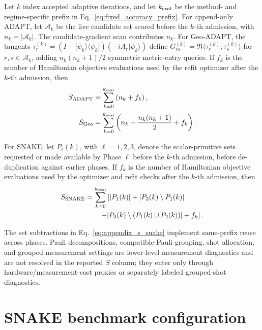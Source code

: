 \documentclass[
  reprint,
  amsmath,
  amssymb,
  aps,
  pra,
  nofootinbib,
  superscriptaddress,
  floatfix
]{revtex4-2}
\begin{document}
Let \(k\) index accepted adaptive iterations, and let \(k_{\rm eval}\) be
the method- and regime-specific prefix in Eq.~\eqref{eq:fixed_accuracy_prefix}.
For append-only ADAPT, let \(\mathcal A_k\) be the live candidate set scored
before the \(k\)-th admission, with \(n_k=|\mathcal A_k|\). The
candidate-gradient scan contributes \(n_k\). For Geo-ADAPT, the tangents
\(\tau_r^{(k)}=(I-|\psi_k\rangle\langle\psi_k|)(-iA_r|\psi_k\rangle)\)
define \(G_{rs}^{(k)}=\Re\langle\tau_r^{(k)},\tau_s^{(k)}\rangle\) for
\(r,s\in\mathcal A_k\), adding \(n_k(n_k+1)/2\) symmetric metric-entry
queries. If \(f_k\) is the number of Hamiltonian objective evaluations used
by the refit optimizer after the \(k\)-th admission, then
\begin{equation*}
\begin{aligned}
S_{\rm ADAPT}
&=
\sum_{k=0}^{k_{\rm eval}}
\left(n_k+f_k\right),
\\
S_{\rm Geo}
&=
\sum_{k=0}^{k_{\rm eval}}
\left(n_k+\frac{n_k(n_k+1)}{2}+f_k\right).
\end{aligned}
\end{equation*}

For SNAKE, let \(P_\ell(k)\), with \(\ell=1,2,3\), denote the scalar-primitive sets requested or made available by Phase \(\ell\) before the \(k\)-th admission, before de-duplication against earlier phases. If \(f_k\) is the number of Hamiltonian objective evaluations used by the optimizer and refit checks after the \(k\)-th admission, then
\begin{align}
S_{\rm SNAKE}
&=
\sum_{k=0}^{k_{\rm eval}}
\left[
|P_1(k)|+|P_2(k)\setminus P_1(k)|
\right.
\nonumber\\
&\qquad\left.
 +|P_3(k)\setminus(P_1(k)\cup P_2(k))|
+f_k
\right].
\label{eq:appendix_s_snake}
\end{align}

The set subtractions in Eq.~\eqref{eq:appendix_s_snake} implement same-prefix reuse across phases. Pauli decompositions, compatible-Pauli grouping, shot allocation, and grouped measurement settings are lower-level measurement diagnostics and are not resolved in the reported \(S\) column; they enter only through hardware/measurement-cost proxies or separately labeled grouped-shot diagnostics.

\section{SNAKE benchmark configuration}
\label{app:results_discussion}
\end{document}
